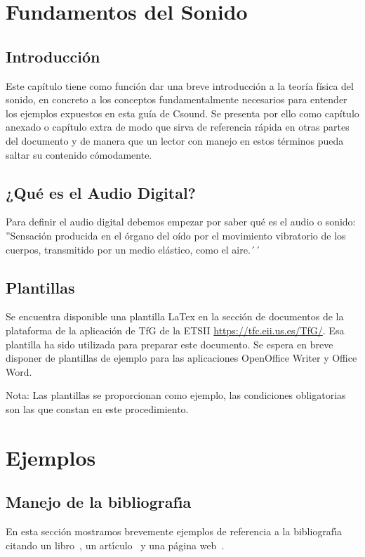 
\chapter{Fundamentos del Sonido}

\section{Introducción}\label{sec:intro}
Este capítulo tiene como función dar una breve introducción a la teoría física del sonido, en concreto a los conceptos fundamentalmente necesarios para entender los ejemplos expuestos en esta guía de Csound.
Se presenta por ello como capítulo anexado o capítulo extra de modo que sirva de referencia rápida en otras partes del documento y de manera que un lector con manejo en estos términos pueda saltar su contenido cómodamente.


\section{¿Qué es el Audio Digital?}\label{sec:DigAud} 
Para definir el audio digital debemos empezar por saber qué es el audio o sonido:
''Sensación producida en el órgano del oído por el movimiento vibratorio de los cuerpos, transmitido por un medio elástico, como el aire.´´

\section{Plantillas}\label{sec:plantillas} 

Se encuentra disponible una plantilla LaTex en la secci\'on de documentos de la plataforma
de la aplicaci\'on de TfG de la ETSII 
\url{https://tfc.eii.us.es/TfG/}. Esa plantilla ha sido utilizada para preparar este documento.
Se espera en breve disponer de plantillas de ejemplo para las aplicaciones OpenOffice Writer y Office Word.

Nota: Las plantillas se proporcionan como ejemplo, las condiciones obligatorias son las que constan en este procedimiento.

\chapter{Ejemplos}\label{qwqwq} 
					
\section{Manejo de la bibliograf{\'\i}a}
En esta secci\'on mostramos brevemente ejemplos de referencia a la bibliograf{\'\i}a 
citando un libro~\cite{desousa}, un art{\'\i}culo~\cite{guiatitlesec} 
y una p\'agina web~\cite{informatica}. 

